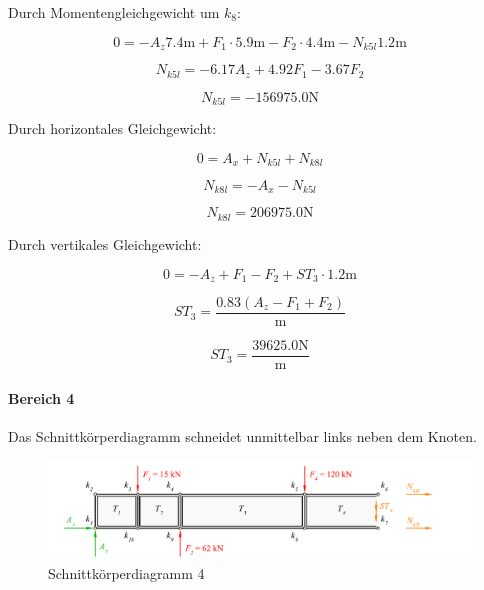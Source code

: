 \documentclass[
  12pt,
  letterpaper,
  DIV=11,
  egregdoesnotlikesansseriftitles]{scrartcl}
\let\oldparagraph\paragraph
\renewcommand{\paragraph}[1]{\oldparagraph{#1}\mbox{}}
\begin{document}
Durch Momentengleichgewicht um \(k_{8}\):

\begin{equation}0 = - A_{z} 7.4 \text{m} + F_{1} \cdot 5.9 \text{m} - F_{2} \cdot 4.4 \text{m} - N_{k5l} 1.2 \text{m}\end{equation}

\begin{equation}N_{k5l} = - 6.17 A_{z} + 4.92 F_{1} - 3.67 F_{2}\end{equation}

\begin{equation}N_{k5l} = - 156975.0 \text{N}\end{equation}

Durch horizontales Gleichgewicht:

\begin{equation}0 = A_{x} + N_{k5l} + N_{k8l}\end{equation}

\begin{equation}N_{k8l} = - A_{x} - N_{k5l}\end{equation}

\begin{equation}N_{k8l} = 206975.0 \text{N}\end{equation}

Durch vertikales Gleichgewicht:

\begin{equation}0 = - A_{z} + F_{1} - F_{2} + ST_{3} \cdot 1.2 \text{m}\end{equation}

\begin{equation}ST_{3} = \frac{0.83 \left(A_{z} - F_{1} + F_{2}\right)}{\text{m}}\end{equation}

\begin{equation}ST_{3} = \frac{39625.0 \text{N}}{\text{m}}\end{equation}

\hypertarget{bereich-4}{%
\paragraph{Bereich 4}\label{bereich-4}}

Das Schnittkörperdiagramm schneidet unmittelbar links neben dem Knoten.

\begin{figure}[H]

{\centering \includegraphics{BSI_HS23_Testat_03_files/mediabag/../images/Testat_03_HS23_SKD1.pdf}

}

\caption{\label{fig-skd4}Schnittkörperdiagramm 4}

\end{figure}
\end{document}
